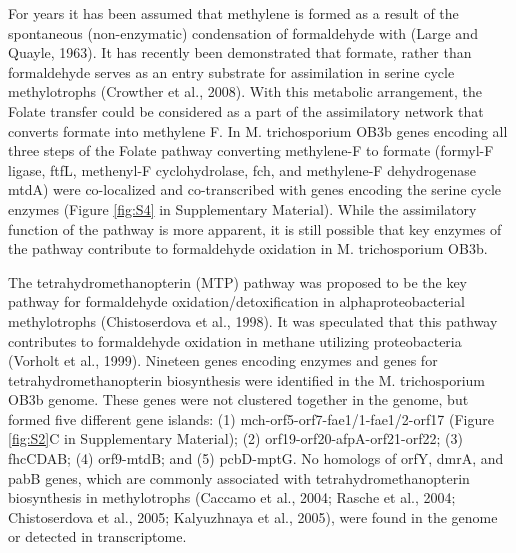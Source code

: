 For years it has been assumed that methylene  is formed as a result of the spontaneous (non-enzymatic) condensation of formaldehyde with  (Large and Quayle, 1963).
It has recently been demonstrated that formate, rather than formaldehyde serves as an entry substrate for assimilation in serine cycle methylotrophs (Crowther et al., 2008).
With this metabolic arrangement, the Folate  transfer could be considered as a part of the assimilatory network that converts formate into methylene F.
In M. trichosporium OB3b genes encoding all three steps of the Folate pathway converting methylene-F to formate (formyl-F ligase, ftfL, methenyl-F cyclohydrolase, fch, and methylene-F dehydrogenase mtdA) were co-localized and co-transcribed with genes encoding the serine cycle enzymes (Figure \ref{fig:S4} in Supplementary Material).
While the assimilatory function of the pathway is more apparent, it is still possible that key enzymes of the pathway contribute to formaldehyde oxidation in M. trichosporium OB3b.

The tetrahydromethanopterin (MTP) pathway was proposed to be the key pathway for formaldehyde oxidation/detoxification in alphaproteobacterial methylotrophs (Chistoserdova et al., 1998).
It was speculated that this pathway contributes to formaldehyde oxidation in methane utilizing proteobacteria (Vorholt et al., 1999).
Nineteen genes encoding enzymes and genes for tetrahydromethanopterin biosynthesis were identified in the M. trichosporium OB3b genome.
These genes were not clustered together in the genome, but formed five different gene islands: (1) mch-orf5-orf7-fae1/1-fae1/2-orf17 (Figure \ref{fig:S2}C in Supplementary Material); (2) orf19-orf20-afpA-orf21-orf22; (3) fhcCDAB; (4) orf9-mtdB; and (5) pcbD-mptG.
No homologs of orfY, dmrA, and pabB genes, which are commonly associated with tetrahydromethanopterin biosynthesis in methylotrophs (Caccamo et al., 2004; Rasche et al., 2004; Chistoserdova et al., 2005; Kalyuzhnaya et al., 2005), were found in the genome or detected in transcriptome.

